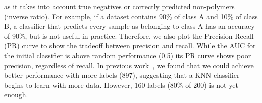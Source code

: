 as it takes into account true negatives or correctly predicted non-polymers (inverse ratio).
For example, if a dataset contains 90\% of class A and 10\% of class B, 
a classifier that predicts every sample as belonging to class A has an accuracy of 90\%, 
but is not useful in practice.
Therefore, we also plot the Precision Recall (PR) curve to show the tradeoff between precision and recall.
While the AUC for the initial classifier is above random performance (0.5) 
its PR curve shows poor precision, regardless of recall.
In previous work~\cite{tchoua2019polyner}, we found that we could 
achieve better performance with more labels (897), suggesting that a KNN classifier begins to learn with more data. 
However, 160 labels (80\% of 200) is not yet enough. %


